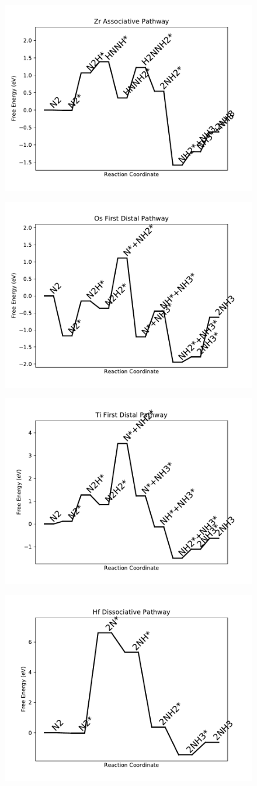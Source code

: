\documentclass[journal=jacsat,manuscript=article]{achemso}
\begin{document}
\begin{figure}
\includegraphics[width=0.5\linewidth]{data/plots/Zr_associative.pdf}
\label{fig:Zr_associative}
\end{figure}

\newpage
\begin{figure}
\includegraphics[width=0.5\linewidth]{data/plots/Os_distal_1.pdf}
\label{fig:Os_distal_1}
\end{figure}

\begin{figure}
\includegraphics[width=0.5\linewidth]{data/plots/Ti_distal_1.pdf}
\label{fig:Ti_distal_1}
\end{figure}

\newpage
\begin{figure}
\includegraphics[width=0.5\linewidth]{data/plots/Hf_dissociative.pdf}
\label{fig:Hf_dissociative}
\end{figure}
\end{document}
